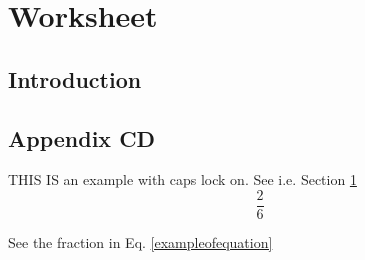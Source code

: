 





\pagestyle{empty}


\pagestyle{fancy}
\setcounter{page}{1}

\tableofcontents
\cleardoublepage
\setcounter{page}{1}


\part{Worksheet}
    \chapter{Introduction} \label{cha:introduction}
        


    
    

    \chapter*{Appendix CD}
        THIS IS an example with caps lock on. See i.e. Section \ref{cha:introduction}
        \begin{equation}
          \frac{2}{6}
        \end{equation} 
        \label{exampleofequation}

    See the fraction in Eq. \ref{exampleofequation}
   
    \listoffixmes

